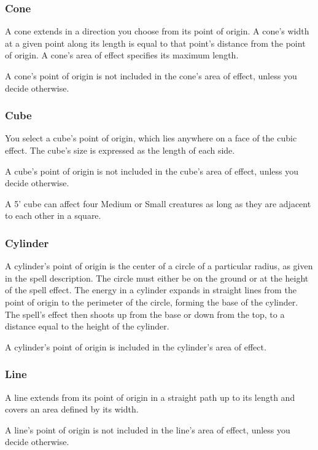 \subsubsection{Cone}

A cone extends in a direction you choose from its point of origin. A cone's width at a given point along its length is equal to that point's distance from the point of origin. A cone's area of effect specifies its maximum length.

A cone's point of origin is not included in the cone's area of effect, unless you decide otherwise.

\subsubsection{Cube}

You select a cube's point of origin, which lies anywhere on a face of the cubic effect. The cube's size is expressed as the length of each side.

A cube's point of origin is not included in the cube's area of effect, unless you decide otherwise.

A 5' cube can affect four Medium or Small creatures as long as they are adjacent to each other in a square.

\subsubsection{Cylinder}

A cylinder's point of origin is the center of a circle of a particular radius, as given in the spell description. The circle must either be on the ground or at the height of the spell effect. The energy in a cylinder expands in straight lines from the point of origin to the perimeter of the circle, forming the base of the cylinder. The spell's effect then shoots up from the base or down from the top, to a distance equal to the height of the cylinder.

A cylinder's point of origin is included in the cylinder's area of effect.

\subsubsection{Line}

A line extends from its point of origin in a straight path up to its length and covers an area defined by its width.

A line's point of origin is not included in the line's area of effect, unless you decide otherwise.

